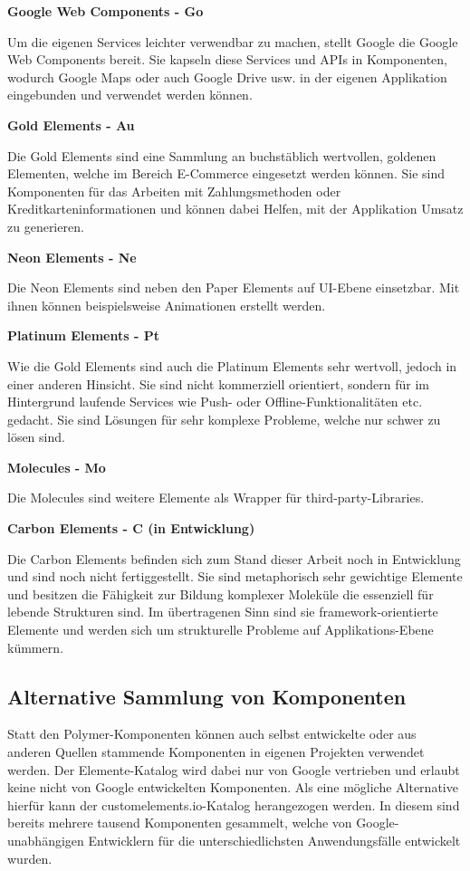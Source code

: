 \textbf{Google Web Components - Go}

Um die eigenen Services leichter verwendbar zu machen, stellt Google die Google Web Components bereit. Sie kapseln diese Services und APIs in Komponenten, wodurch Google Maps oder auch Google Drive usw. in der eigenen Applikation eingebunden und verwendet werden können.

\textbf{Gold Elements - Au}

Die Gold Elements sind eine Sammlung an buchstäblich wertvollen, goldenen Elementen, welche im Bereich E-Commerce eingesetzt werden können. Sie sind Komponenten für das Arbeiten mit Zahlungsmethoden oder Kreditkarteninformationen und können dabei Helfen, mit der Applikation Umsatz zu generieren.

\textbf{Neon Elements - Ne}

Die Neon Elements sind neben den Paper Elements auf UI-Ebene einsetzbar. Mit ihnen können beispielsweise Animationen erstellt werden.

\textbf{Platinum Elements - Pt}

Wie die Gold Elements sind auch die Platinum Elements sehr wertvoll, jedoch in einer anderen Hinsicht. Sie sind nicht kommerziell orientiert, sondern für im Hintergrund laufende Services wie Push- oder Offline-Funktionalitäten etc. gedacht. Sie sind Lösungen für sehr komplexe Probleme, welche nur schwer zu lösen sind.

\textbf{Molecules - Mo}

Die Molecules sind weitere Elemente als Wrapper für third-party-Libraries.

\textbf{Carbon Elements - C (in Entwicklung)}

Die Carbon Elements befinden sich zum Stand dieser Arbeit noch in Entwicklung und sind noch nicht fertiggestellt. Sie sind metaphorisch sehr gewichtige Elemente und besitzen die Fähigkeit zur Bildung komplexer Moleküle die essenziell für lebende Strukturen sind. Im übertragenen Sinn sind sie framework-orientierte Elemente und werden sich um strukturelle Probleme auf Applikations-Ebene kümmern.

\subsection{Alternative Sammlung von Komponenten}\label{alternative-sammlung-von-komponenten}

Statt den Polymer-Komponenten können auch selbst entwickelte oder aus anderen Quellen stammende Komponenten in eigenen Projekten verwendet werden. Der Elemente-Katalog wird dabei nur von Google vertrieben und erlaubt keine nicht von Google entwickelten Komponenten. Als eine mögliche Alternative hierfür kann der customelements.io-Katalog \cite{citeulike:13916423} herangezogen werden. In diesem sind bereits mehrere tausend Komponenten gesammelt, welche von Google-unabhängigen Entwicklern für die unterschiedlichsten Anwendungsfälle entwickelt wurden.

